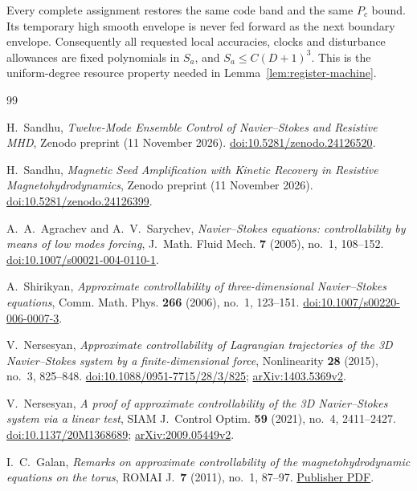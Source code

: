 \documentclass[11pt,a4paper]{amsart}
\theoremstyle{definition}
\theoremstyle{remark}
\numberwithin{equation}{section}
\begin{document}
Every complete assignment restores the same code band and the same
$P_c$ bound.  Its temporary high smooth envelope is never fed forward
as the next boundary envelope.  Consequently all requested local
accuracies, clocks and disturbance allowances are fixed polynomials
in $S_a$, and $S_a\le C(D+1)^3$.  This is the uniform-degree resource
property needed in Lemma~\ref{lem:register-machine}.

\clearpage
\begin{thebibliography}{99}
\raggedright

H.~Sandhu,
\emph{Twelve-Mode Ensemble Control of Navier--Stokes and Resistive MHD},
Zenodo preprint (11 November 2026).
\href{https://doi.org/10.5281/zenodo.24126520}{doi:10.5281/zenodo.24126520}.

H.~Sandhu,
\emph{Magnetic Seed Amplification with Kinetic Recovery in Resistive
Magnetohydrodynamics},
Zenodo preprint (11 November 2026).
\href{https://doi.org/10.5281/zenodo.24126399}{doi:10.5281/zenodo.24126399}.

A.~A.~Agrachev and A.~V.~Sarychev,
\emph{Navier--Stokes equations: controllability by means of low modes forcing},
J.~Math. Fluid Mech. \textbf{7} (2005), no.~1, 108--152.
\href{https://doi.org/10.1007/s00021-004-0110-1}{doi:10.1007/s00021-004-0110-1}.

A.~Shirikyan,
\emph{Approximate controllability of three-dimensional Navier--Stokes equations},
Comm. Math. Phys. \textbf{266} (2006), no.~1, 123--151.
\href{https://doi.org/10.1007/s00220-006-0007-3}{doi:10.1007/s00220-006-0007-3}.

V.~Nersesyan,
\emph{Approximate controllability of Lagrangian trajectories of the
3D Navier--Stokes system by a finite-dimensional force},
Nonlinearity \textbf{28} (2015), no.~3, 825--848.
\href{https://doi.org/10.1088/0951-7715/28/3/825}{doi:10.1088/0951-7715/28/3/825};
\href{https://arxiv.org/pdf/1403.5369v2}{arXiv:1403.5369v2}.

V.~Nersesyan,
\emph{A proof of approximate controllability of the 3D Navier--Stokes system
via a linear test},
SIAM J.~Control Optim. \textbf{59} (2021), no.~4, 2411--2427.
\href{https://doi.org/10.1137/20M1368689}{doi:10.1137/20M1368689};
\href{https://arxiv.org/pdf/2009.05449v2}{arXiv:2009.05449v2}.

I.~C.~Galan,
\emph{Remarks on approximate controllability of the magnetohydrodynamic
equations on the torus},
ROMAI J.~\textbf{7} (2011), no.~1, 87--97.
\href{https://rj.romai.ro/arhiva/2011/1/Galan.pdf}{Publisher PDF}.


\end{thebibliography}
\end{document}
